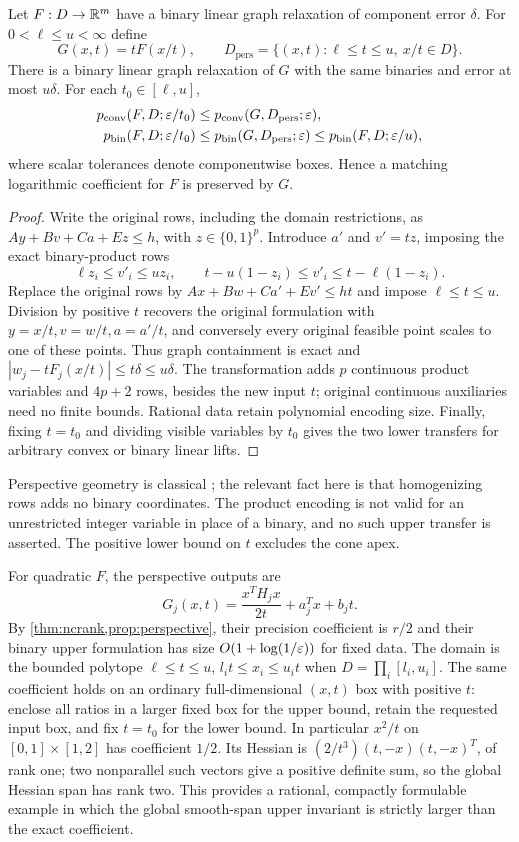 \begin{proposition}\label{prop:perspective}
Let $F:D\to\mathbb R^m$ have a binary linear graph relaxation of component
error $\delta$. For $0<\ell\le u<\infty$ define
\[
 G(x,t)=tF(x/t),\qquad
 D_{\mathrm{pers}}=\{(x,t):\ell\le t\le u,\ x/t\in D\}.
\]
There is a binary linear graph relaxation of $G$ with the same binaries
and error at most $u\delta$. For each $t_0\in[\ell,u]$,
\begin{align*}
 p_{\mathrm{conv}}(F,D;\varepsilon/t_0)&\le p_{\mathrm{conv}}(G,D_{\mathrm{pers}};\varepsilon),\\
 p_{\mathrm{bin}}(F,D;\varepsilon/t_0)&\le p_{\mathrm{bin}}(G,D_{\mathrm{pers}};\varepsilon)
                         \le p_{\mathrm{bin}}(F,D;\varepsilon/u),
\end{align*}
where scalar tolerances denote componentwise boxes. Hence a matching
logarithmic coefficient for $F$ is preserved by $G$.
\end{proposition}
\begin{proof}
Write the original rows, including the domain restrictions, as
$Ay+Bv+Ca+Ez\le h$, with $z\in\{0,1\}^p$.
Introduce $a'$ and $v'=tz$, imposing the exact binary-product rows
\[
 \ell z_i\le v'_i\le uz_i,\qquad
 t-u(1-z_i)\le v'_i\le t-\ell(1-z_i).
\]
Replace the original rows by $Ax+Bw+Ca'+Ev'\le ht$ and impose
$\ell\le t\le u$. Division by positive $t$ recovers the original
formulation with $y=x/t,v=w/t,a=a'/t$, and conversely every original
feasible point scales to one of these points. Thus graph containment
is exact and $|w_j-tF_j(x/t)|\le t\delta\le u\delta$.
The transformation adds $p$ continuous product variables and $4p+2$
rows, besides the new input $t$; original continuous auxiliaries need
no finite bounds. Rational data retain polynomial encoding size.
Finally, fixing $t=t_0$ and dividing visible variables by $t_0$ gives
the two lower transfers for arbitrary convex or binary linear lifts.
\end{proof}

Perspective geometry is classical \citep[Sections 2.3.3 and 3.2.6]{boyd2004};
the relevant fact here is that homogenizing rows adds no binary
coordinates. The product encoding is not valid for an unrestricted
integer variable in place of a binary, and no such upper transfer is
asserted. The positive lower bound on $t$ excludes the cone apex.

For quadratic $F$, the perspective outputs are
\[
 G_j(x,t)=\frac{x^TH_jx}{2t}+a_j^Tx+b_jt.
\]
By \cref{thm:ncrank,prop:perspective}, their precision coefficient is
$r/2$ and their binary upper formulation has size
$O(1+\log(1/\varepsilon))$ for fixed data. The domain is the bounded polytope
$\ell\le t\le u$, $l_it\le x_i\le u_it$ when
$D=\prod_i[l_i,u_i]$. The same coefficient holds on an ordinary
full-dimensional $(x,t)$ box with positive $t$: enclose all ratios in
a larger fixed box for the upper bound, retain the requested input
box, and fix $t=t_0$ for the lower bound.
In particular $x^2/t$ on $[0,1]\times[1,2]$ has coefficient $1/2$.
Its Hessian is $(2/t^3)(t,-x)(t,-x)^T$, of rank one; two nonparallel
such vectors give a positive definite sum, so the global Hessian
span has rank two. This provides a rational, compactly formulable
example in which the global smooth-span upper invariant is strictly
larger than the exact coefficient.
